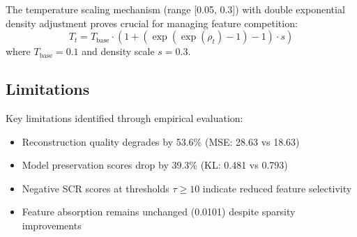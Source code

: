 \documentclass{article} %
\begin{document}
The temperature scaling mechanism (range [0.05, 0.3]) with double exponential density adjustment proves crucial for managing feature competition:
\begin{equation}
T_t = T_{\text{base}} \cdot (1 + (\exp(\exp(\rho_t) - 1) - 1) \cdot s)
\end{equation}
where $T_{\text{base}}=0.1$ and density scale $s=0.3$.

\subsection{Limitations}
Key limitations identified through empirical evaluation:
\begin{itemize}
    \item Reconstruction quality degrades by 53.6\% (MSE: 28.63 vs 18.63)
    \item Model preservation scores drop by 39.3\% (KL: 0.481 vs 0.793)
    \item Negative SCR scores at thresholds $\tau \geq 10$ indicate reduced feature selectivity
    \item Feature absorption remains unchanged (0.0101) despite sparsity improvements
\end{itemize}
\end{document}

